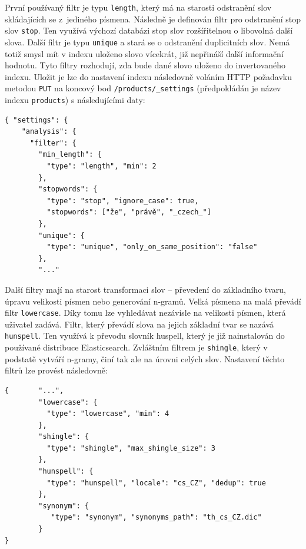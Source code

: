 \documentclass[FM,DP]{tulthesis}
\newenvironment{code}
    {\filbreak\captionsetup{type=listing}}{\filbreak}
\begin{document}
První používaný filtr je typu \verb|length|, který má na starosti odstranění slov skládajících
se z~jediného písmena. Následně je definován filtr pro odstranění stop slov \verb|stop|.
Ten využívá výchozí databázi stop slov rozšířitelnou o libovolná další slova. Další filtr
je typu \verb|unique| a stará se o odstranění duplicitních slov. Nemá totiž smysl mít v indexu
uloženo slovo vícekrát, již nepřináší další informační hodnotu. Tyto filtry rozhodují, 
zda bude dané slovo uloženo do invertovaného indexu. Uložit je lze do nastavení indexu
následovně voláním HTTP požadavku metodou \verb|PUT| na koncový bod \verb|/products/_settings| 
(předpokládán je název indexu \verb|products|) s následujícími daty:

\begin{code}
\captionsetup{singlelinecheck=false,justification=raggedright}
\label{code:es-filters-1}
\begin{verbatim}
{ "settings": {
    "analysis": {
      "filter": {
        "min_length": {
          "type": "length", "min": 2
        },
        "stopwords": {
          "type": "stop", "ignore_case": true, 
          "stopwords": ["že", "právě", "_czech_"]
        },
        "unique": {
          "type": "unique", "only_on_same_position": "false"
        },
        "..."
\end{verbatim}
\end{code}

Další filtry mají na starost transformaci slov -- převedení do základního tvaru, 
úpravu velikosti písmen nebo generování n-gramů. Velká písmena na malá převádí filtr 
\verb|lowercase|. Díky tomu lze vyhledávat nezávisle na velikosti písmen, která uživatel zadává. 
Filtr, který převádí slova na jejich základní tvar se nazává \verb|hunspell|. Ten využívá
k převodu slovník huspell, který je již nainstalován do používané distribuce Elasticsearch.
Zvláštním filtrem je \verb|shingle|, který v podstatě vytváří n-gramy, činí tak ale na úrovni 
celých slov. Nastavení těchto filtrů lze provést následovně:

\begin{code}
\captionsetup{singlelinecheck=false,justification=raggedright}
\label{code:es-filters-2}
\begin{verbatim}
{       "...",
        "lowercase": {
          "type": "lowercase", "min": 4
        },
        "shingle": {
          "type": "shingle", "max_shingle_size": 3
        },
        "hunspell": {
          "type": "hunspell", "locale": "cs_CZ", "dedup": true
        },
        "synonym": {
           "type": "synonym", "synonyms_path": "th_cs_CZ.dic"
        }
}
\end{verbatim}
\end{code}
\end{document}
